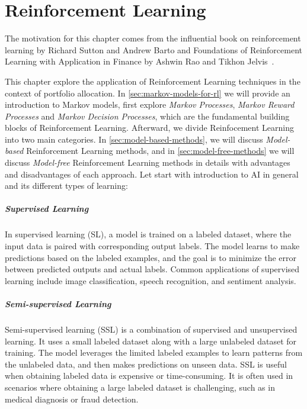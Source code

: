 \documentclass[../xlapes02]{subfiles}
\begin{document}
    \chapter{Reinforcement Learning}\label{ch:reinforcement-learning}

    The motivation for this chapter comes from the influential book on reinforcement learning by Richard Sutton and Andrew Barto and Foundations of Reinforcement Learning with Application in Finance by Ashwin Rao and Tikhon Jelvis~\cite{rao2022foundations, sutton2018reinforcement}.

    This chapter explore the application of Reinforcement Learning techniques in the context of portfolio allocation. In \cref{sec:markov-models-for-rl} we will provide an introduction to Markov models, first explore \emph{Markov Processes}, \emph{Markov Reward Processes} and \emph{Markov Decision Processes}, which are the fundamental building blocks of Reinforcement Learning. Afterward, we divide Reinfocement Learning into two main categories. In \cref{sec:model-based-methods}, we will discuss \emph{Model-based} Reinforcement Learning methods, and in \cref{sec:model-free-methods} we will discuss \emph{Model-free} Reinforcement Learning methods in details with advantages and disadvantages of each approach. Let start with introduction to AI in general and its different types of learning:

    \paragraph{Supervised Learning}
    In supervised learning (SL), a model is trained on a labeled dataset, where the input data is paired with corresponding output labels. The model learns to make predictions based on the labeled examples, and the goal is to minimize the error between predicted outputs and actual labels. Common applications of supervised learning include image classification, speech recognition, and sentiment analysis.

    \paragraph{Semi-supervised Learning}
    Semi-supervised learning (SSL) is a combination of supervised and unsupervised learning. It uses a small labeled dataset along with a large unlabeled dataset for training. The model leverages the limited labeled examples to learn patterns from the unlabeled data, and then makes predictions on unseen data. SSL is useful when obtaining labeled data is expensive or time-consuming. It is often used in scenarios where obtaining a large labeled dataset is challenging, such as in medical diagnosis or fraud detection.
\end{document}
